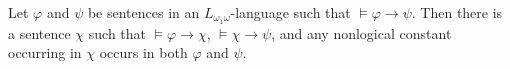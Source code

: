 Let $\varphi$ and $\psi$ be sentences in an $L_{\omega_1\omega}$-language such that $\models \varphi \rightarrow \psi$. Then there is a sentence $\chi$ such that $\models \varphi \rightarrow \chi$, $\models \chi \rightarrow \psi$, and any nonlogical constant occurring in $\chi$ occurs in both $\varphi$ and $\psi$.
